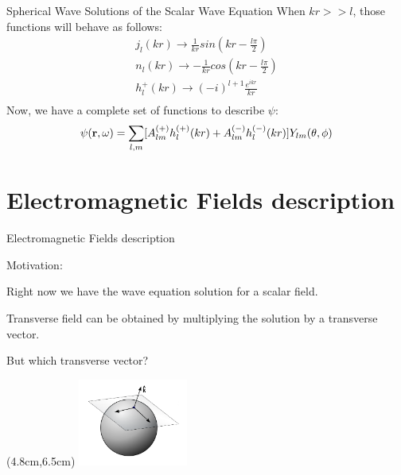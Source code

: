 \documentclass[10pt]{beamer}
\begin{document}

\begin{frame}[fragile]{Spherical Wave Solutions of the Scalar Wave Equation}
    When $kr>>l$, those functions will behave as follows:
      \begin{equation*}
        \begin{split}
          j_l(kr)\rightarrow \frac{1}{kr}sin\left(kr-\frac{l\pi}{2}\right)\\
          n_l(kr)\rightarrow -\frac{1}{kr}cos\left(kr-\frac{l\pi}{2}\right)\\
          h_l^{+}(kr)\rightarrow (-i)^{l+1} \frac{e^{ikr}}{kr}\\
        \end{split}
      \end{equation*}
Now, we have a complete set of functions to describe $\psi$:
      \begin{equation*}
          \psi({\bf r},\omega)=\sum_{l,m} [A^{(+)}_{lm}h^{(+)}_l(kr) + A^{(-)}_{lm}h^{(-)}_l(kr)]Y_{lm}(\theta,\phi)
      \end{equation*}

\end{frame}


\section{Electromagnetic Fields description}


\begin{frame}[fragile]{Electromagnetic Fields description}

Motivation: 
  \begin{center}
  Right now we have the wave equation solution for a scalar field.

  Transverse field can be obtained by multiplying the solution by a transverse vector.

  \alert{But which transverse vector?}
  \end{center}
        \begin{textblock*}{3cm}(4.8cm,6.5cm)
            \includegraphics[width=3.6cm]{tangesfk}
        \end{textblock*}

\end{frame}
\end{document}
